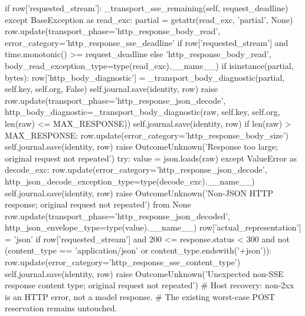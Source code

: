{                        if row['requested_stream']:
                            _transport_sse_remaining(self, request_deadline)
                    except BaseException as read_exc:
                        partial = getattr(read_exc, 'partial', None)
                        row.update(transport_phase='http_response_body_read',
                                   error_category='http_response_sse_deadline' if row['requested_stream'] and time.monotonic() >= request_deadline else 'http_response_body_read',
                                   body_read_exception_type=type(read_exc).__name__)
                        if isinstance(partial, bytes):
                            row['http_body_diagnostic'] = _transport_body_diagnostic(partial, self.key, self.org, False)
                        self.journal.save(identity, row)
                        raise
                    row.update(transport_phase='http_response_json_decode',
                               http_body_diagnostic=_transport_body_diagnostic(raw, self.key, self.org, len(raw) <= MAX_RESPONSE))
                    self.journal.save(identity, row)
                    if len(raw) > MAX_RESPONSE:
                        row.update(error_category='http_response_body_size')
                        self.journal.save(identity, row)
                        raise OutcomeUnknown('Response too large; original request not repeated')
                    try:
                        value = json.loads(raw)
                    except ValueError as decode_exc:
                        row.update(error_category='http_response_json_decode',
                                   http_json_decode_exception_type=type(decode_exc).__name__)
                        self.journal.save(identity, row)
                        raise OutcomeUnknown('Non-JSON HTTP response; original request not repeated') from None
                    row.update(transport_phase='http_response_json_decoded', http_json_envelope_type=type(value).__name__)
                    row['actual_representation'] = 'json'
                    if row['requested_stream'] and 200 <= response.status < 300 and not (content_type == 'application/json' or content_type.endswith('+json')):
                        row.update(error_category='http_response_sse_content_type')
                        self.journal.save(identity, row)
                        raise OutcomeUnknown('Unexpected non-SSE response content type; original request not repeated')
                # Host recovery: non-2xx is an HTTP error, not a model response.
                # The existing worst-case POST reservation remains untouched.
}
